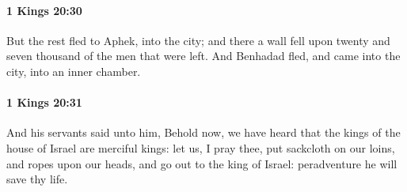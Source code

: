 		\paragraph{1 Kings 20:30} %
			\label{1KINGS-20-30}

			But the rest fled to Aphek, into the city; and there a wall fell upon twenty and seven thousand of the men that were left. And Benhadad fled, and came into the city, into an inner chamber.


		\paragraph{1 Kings 20:31} %
			\label{1KINGS-20-31}

			And his servants said unto him, Behold now, we have heard that the kings of the house of Israel are merciful kings: let us, I pray thee, put sackcloth on our loins, and ropes upon our heads, and go out to the king of Israel: peradventure he will save thy life.

